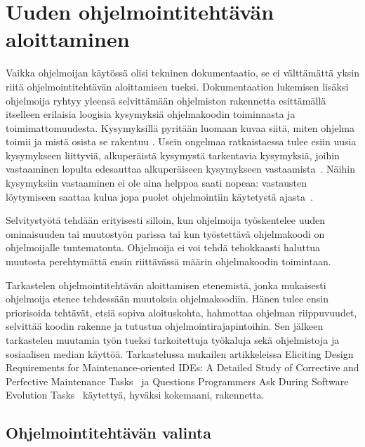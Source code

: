 \documentclass[finnish]{tktltiki2}
\theoremstyle{definition}
\theoremstyle{remark}
\begin{document}
\section{Uuden ohjelmointitehtävän aloittaminen}
\label{section:ekatk}

Vaikka ohjelmoijan käytössä olisi tekninen dokumentaatio, se ei välttämättä yksin riitä ohjelmointitehtävän aloittamisen tueksi. Dokumentaation lukemisen lisäksi ohjelmoija ryhtyy yleensä selvittämään ohjelmiston rakennetta esittämällä itselleen erilaisia loogisia kysymyksiä ohjelmakoodin toiminnasta ja toimimattomuudesta. Kysymyksillä pyritään luomaan kuvaa siitä, miten ohjelma toimii ja mistä osista se rakentuu \cite{g_search_code, questions-during-software-evolution-tasks,asking-and-answering-api-questions}. Usein ongelmaa ratkaistaessa tulee esiin uusia kysymykseen liittyviä, alkuperäistä kysymystä tarkentavia kysymyksiä, joihin vastaaminen lopulta edesauttaa alkuperäiseen kysymykseen vastaamista~\cite{questions-during-software-evolution-tasks}. Näihin kysymyksiin vastaaminen ei ole aina helppoa saati nopeaa: vastausten löytymiseen saattaa kulua jopa puolet ohjelmointiin käytetystä ajasta~\cite{eliciting-design-requirements-for-maintenance-oriented-ides}.

Selvitystyötä tehdään erityisesti silloin, kun ohjelmoija työskentelee uuden ominaisuuden tai muutostyön parissa tai kun työstettävä ohjelmakoodi on ohjelmoijalle tuntematonta. Ohjelmoija ei voi tehdä tehokkaasti haluttua muutosta perehtymättä ensin riittävässä määrin ohjelmakoodin toimintaan.

Tarkastelen ohjelmointitehtävän aloittamisen etenemistä, jonka mukaisesti ohjelmoija etenee tehdessään muutoksia ohjelmakoodiin. Hänen tulee ensin priorisoida tehtävät, etsiä sopiva aloituskohta, hahmottaa ohjelman riippuvuudet, selvittää koodin rakenne ja tutustua ohjelmointirajapintoihin. Sen jälkeen tarkastelen muutamia työn tueksi tarkoitettuja työkaluja sekä ohjelmistoja ja sosiaalisen median käyttöä. Tarkastelussa mukailen artikkeleissa Eliciting Design Requirements for Maintenance-oriented IDEs: A Detailed Study of Corrective and Perfective Maintenance Tasks~\cite{eliciting-design-requirements-for-maintenance-oriented-ides} ja Questions Programmers Ask During Software Evolution Tasks~\cite{questions-during-software-evolution-tasks} käytettyä, hyväksi kokemaani, rakennetta.

\subsection{Ohjelmointitehtävän valinta}
\end{document}
